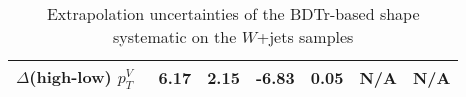 \begin{table}[!htb]
{\begin{tabular}{lS[table-format=3.2]S[table-format=3.2]S[table-format=3.2]S[table-format=3.2]S[table-format=3.2]S[table-format=3.2]}
      $\Delta$(high-low) $p_T^V$\   &  6.17  & 2.15  & -6.83 & 0.05 &   N/A      &    N/A  \\
      \bottomrule
    \end{tabular}
  }
  \caption{Extrapolation uncertainties of the BDTr-based shape systematic on the
    $W$+jets samples}
  \label{tab:wjets-extrapolation_uncertainties_BDTr}
\end{table}